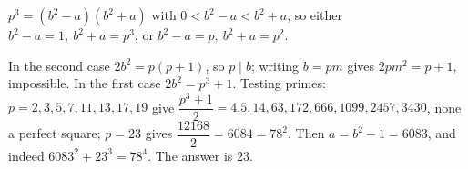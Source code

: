 $p^3=(b^2-a)(b^2+a)$ with $0<b^2-a<b^2+a$, so either $b^2-a=1,\ b^2+a=p^3$, or $b^2-a=p,\ b^2+a=p^2$.

In the second case $2b^2=p(p+1)$, so $p\mid b$; writing $b=pm$ gives $2pm^2=p+1$, impossible. In the first case $2b^2=p^3+1$. Testing primes: $p=2,3,5,7,11,13,17,19$ give $\dfrac{p^3+1}2=4.5,14,63,172,666,1099,2457,3430$, none a perfect square; $p=23$ gives $\dfrac{12168}2=6084=78^2$. Then $a=b^2-1=6083$, and indeed $6083^2+23^3=78^4$. The answer is $\boxed{23}$.
